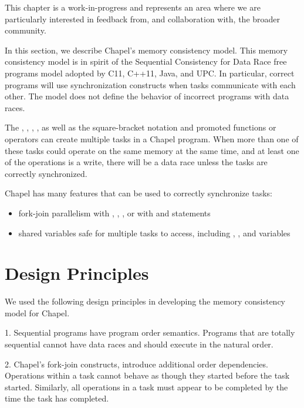 \label{Memory_Consistency_Model}

\begin{openissue}
  This chapter is a work-in-progress and represents an area where we
  are particularly interested in feedback from, and collaboration
  with, the broader community.
\end{openissue}

In this section, we describe Chapel's memory consistency model. This memory
consistency model is in spirit of the Sequential Consistency for Data Race free
programs model adopted by C11, C++11, Java, and UPC. In particular, correct
programs will use synchronization constructs when tasks communicate with each
other. The model does not define the behavior of incorrect programs with data
races.

The , , , , as well as
the square-bracket notation and promoted functions or operators can create
multiple tasks in a Chapel program. When more than one of these tasks could
operate on the same memory at the same time, and at least one of the operations
is a write, there will be a data race unless the tasks are correctly
synchronized.

Chapel has many features that can be used to correctly synchronize tasks:
\begin{itemize}
  \item fork-join parallelism with , , , or with  and  statements
  \item shared variables safe for multiple tasks to access, including , , and  variables
\end{itemize}

\section{Design Principles}

We used the following design principles in developing the memory consistency
model for Chapel.

1. Sequential programs have program order semantics. Programs that are totally sequential cannot have data races and should execute in the natural order.

2. Chapel's fork-join constructs, introduce additional order dependencies. Operations within a task cannot behave as though they started before the task started. Similarly, all operations in a task must appear to be completed by the time the task has completed.

